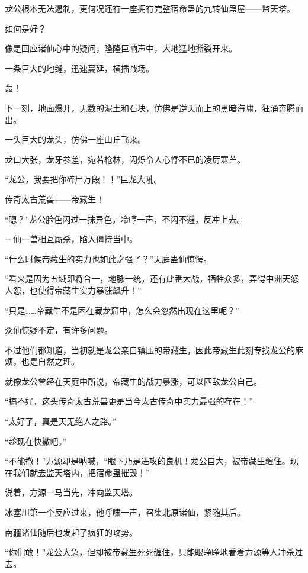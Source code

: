 \begin{this_body}
龙公根本无法遏制，更何况还有一座拥有完整宿命蛊的九转仙蛊屋——监天塔。

如何是好？

像是回应诸仙心中的疑问，隆隆巨响声中，大地猛地撕裂开来。

一条巨大的地缝，迅速蔓延，横插战场。

轰！

下一刻，地面爆开，无数的泥土和石块，仿佛是逆天而上的黑暗海啸，狂涌奔腾而出。

一头巨大的龙头，仿佛一座山丘飞来。

龙口大张，龙牙参差，宛若枪林，闪烁令人心悸不已的凌厉寒芒。

“龙公，我要把你碎尸万段！！”巨龙大吼。

传奇太古荒兽——帝藏生！

“嗯？”龙公脸色闪过一抹异色，冷哼一声，不闪不避，反冲上去。

一仙一兽相互厮杀，陷入僵持当中。

“什么时候帝藏生的实力也如此之强了？”天庭蛊仙惊愕。

“看来是因为五域即将合一，地脉一统，还有此番大战，牺牲众多，弄得中洲天怒人怨，也使得帝藏生实力暴涨飙升！”

“只是……帝藏生不是困在藏龙窟中，怎么会忽然出现在这里呢？”

众仙惊疑不定，有许多问题。

不过他们都知道，当初就是龙公亲自镇压的帝藏生，因此帝藏生此刻专找龙公的麻烦，也是自然之理。

就像龙公曾经在天庭中所说，帝藏生的战力暴涨，可以匹敌龙公自己。

“搞不好，这头传奇太古荒兽更是当今太古传奇中实力最强的存在！”

“太好了，真是天无绝人之路。”

“趁现在快撤吧。”

“不能撤！”方源却是呐喊，“眼下乃是进攻的良机！龙公自大，被帝藏生缠住。现在我们就去监天塔内，把宿命蛊摧毁！”

说着，方源一马当先，冲向监天塔。

冰塞川第一个反应过来，他呼啸一声，召集北原诸仙，紧随其后。

南疆诸仙随后也发起了疯狂的攻势。

“你们敢！”龙公大急，但却被帝藏生死死缠住，只能眼睁睁地看着方源等人冲杀过去。

\end{this_body}

